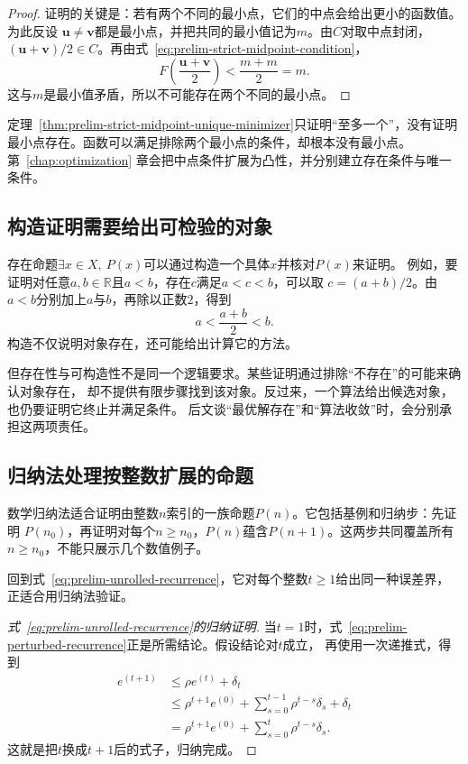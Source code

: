 \begin{proof}
证明的关键是：若有两个不同的最小点，它们的中点会给出更小的函数值。为此反设
$\bm{u}\neq\bm{v}$都是最小点，并把共同的最小值记为$m$。由$C$对取中点封闭，
$(\bm{u}+\bm{v})/2\in C$。再由式~\eqref{eq:prelim-strict-midpoint-condition}，
\[
  F\left(\frac{\bm{u}+\bm{v}}{2}\right)
  <
  \frac{m+m}{2}
  =m.
\]
这与$m$是最小值矛盾，所以不可能存在两个不同的最小点。
\end{proof}

定理~\ref{thm:prelim-strict-midpoint-unique-minimizer}只证明“至多一个”，没有证明
最小点存在。函数可以满足排除两个最小点的条件，却根本没有最小点。第~\ref{chap:optimization}
章会把中点条件扩展为凸性，并分别建立存在条件与唯一条件。

\subsection{构造证明需要给出可检验的对象}

存在命题$\exists x\in X,\ P(x)$可以通过构造一个具体$x$并核对$P(x)$来证明。
例如，要证明对任意$a,b\in\mathbb{R}$且$a<b$，存在$c$满足$a<c<b$，可以取
$c=(a+b)/2$。由$a<b$分别加上$a$与$b$，再除以正数$2$，得到
\[
  a<\frac{a+b}{2}<b.
\]
构造不仅说明对象存在，还可能给出计算它的方法。

但存在性与可构造性不是同一个逻辑要求。某些证明通过排除“不存在”的可能来确认对象存在，
却不提供有限步骤找到该对象。反过来，一个算法给出候选对象，也仍要证明它终止并满足条件。
后文谈“最优解存在”和“算法收敛”时，会分别承担这两项责任。

\subsection{归纳法处理按整数扩展的命题}

数学归纳法适合证明由整数$n$索引的一族命题$P(n)$。它包括基例和归纳步：先证明
$P(n_0)$，再证明对每个$n\geq n_0$，$P(n)$蕴含$P(n+1)$。这两步共同覆盖所有
$n\geq n_0$，不能只展示几个数值例子。

回到式~\eqref{eq:prelim-unrolled-recurrence}，它对每个整数$t\geq1$给出同一种误差界，
正适合用归纳法验证。
\begin{proof}[式~\eqref{eq:prelim-unrolled-recurrence}的归纳证明]
当$t=1$时，式~\eqref{eq:prelim-perturbed-recurrence}正是所需结论。假设结论对$t$成立，
再使用一次递推式，得到
\begin{align*}
  e^{(t+1)}
  &\leq \rho e^{(t)}+\delta_t\\
  &\leq
  \rho^{t+1}e^{(0)}
  +
  \sum_{s=0}^{t-1}\rho^{t-s}\delta_s
  +\delta_t\\
  &=
  \rho^{t+1}e^{(0)}
  +
  \sum_{s=0}^{t}\rho^{t-s}\delta_s.
\end{align*}
这就是把$t$换成$t+1$后的式子，归纳完成。
\end{proof}

